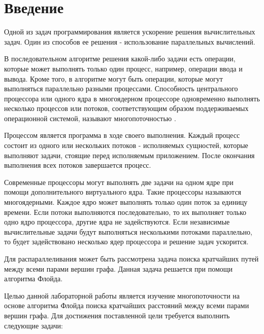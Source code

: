 \chapter*{Введение}

Одной из задач программирования является ускорение решения вычислительных задач. Один из способов ее решения - использование параллельных вычислений.

В последовательном алгоритме решения какой-либо задачи есть операции, которые может выполнять только один процесс, например, операции ввода и вывода. Кроме того, в алгоритме могут быть операции, которые могут выполняться параллельно разными процессами. Способность центрального процессора или одного ядра в многоядерном процессоре одновременно выполнять несколько процессов или потоков, соответствующим образом поддерживаемых операционной системой, называют многопоточностью \cite{multithreading}.

Процессом является программа в ходе своего выполнения. Каждый процесс состоит из одного или нескольких потоков - исполняемых сущностей, которые выполняют задачи, стоящие перед исполняемым приложением. После окончания выполнения всех потоков завершается процесс.

Современные процессоры могут выполнять две задачи на одном ядре при помощи дополнительного виртуального ядра. Такие процессоры называются многоядерными. Каждое ядро может выполнять только один поток за единицу времени. Если потоки выполняются последовательно, то их выполняет только одно ядро процессора, другие ядра не задействуются. Если независимые вычислительные задачи будут выполняться несколькими потоками параллельно, то будет задействовано несколько ядер процессора и решение задач ускорится.

Для распараллеливания может быть рассмотрена задача поиска кратчайших путей между всеми парами вершин графа. Данная задача решается при помощи алгоритма Флойда.

Целью данной лабораторной работы является изучение многопоточности на основе алгоритма Флойда поиска кратчайших расстояний между всеми парами вершин графа. Для достижения поставленной цели требуется выполнить следующие задачи:

